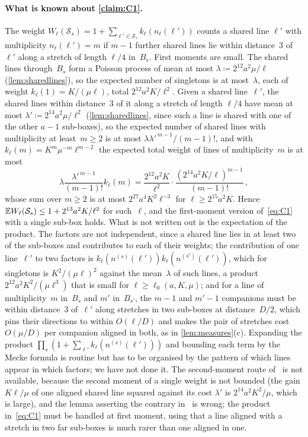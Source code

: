 \documentclass[11pt,letterpaper]{article}
\begin{document}
\paragraph{What is known about \cref{claim:C1}.} The weight $W_\ell(\mathcal S_s)=1+\sum_{\ell'\in\mathcal S_s}k_\ell(n_{\ell}(\ell'))$ counts a shared line $\ell'$ with multiplicity $n_\ell(\ell')=m$ if $m-1$ further shared lines lie within distance~$3$ of~$\ell'$ along a stretch of length $\ell/4$ in~$B_s$. First moments are small. The shared lines through~$B_s$ form a Poisson process of mean at most $\lambda\coloneqq2^{12}a^2\mu/\ell$ (\cref{lem:sharedlines}), so the expected number of singletons is at most~$\lambda$, each of weight $k_\ell(1)=K/(\mu\ell)$, total $2^{12}a^2K/\ell^2$. Given a shared line~$\ell'$, the shared lines within distance~$3$ of it along a stretch of length $\ell/4$ have mean at most $\lambda'\coloneqq2^{14}a^2\mu/\ell^2$ (\cref{lem:sharedlines}, since such a line is shared with one of the other $a-1$ sub-boxes), so the expected number of shared lines with multiplicity at least~$m\ge2$ is at most $\lambda\lambda'^{\,m-1}/(m-1)!$, and with $k_\ell(m)=K^m\mu^{-m}\ell^{m-2}$ the expected total weight of lines of multiplicity~$m$ is at most
\begin{equation*}
  \lambda\frac{\lambda'^{\,m-1}}{(m-1)!}k_\ell(m)=\frac{2^{12}a^2K}{\ell^2}\cdot\frac{(2^{14}a^2K/\ell)^{m-1}}{(m-1)!}\,,
\end{equation*}
whose sum over $m\ge2$ is at most $2^{27}a^4K^2\ell^{-3}$ for $\ell\ge2^{15}a^2K$. Hence $\mathbb E W_\ell(\mathcal S_s)\le1+2^{13}a^2K/\ell^2$ for such~$\ell$, and the first-moment version of~\eqref{eq:C1} with a single sub-box holds. What is not written out is the expectation of the product. The factors are not independent, since a shared line lies in at least two of the sub-boxes and contributes to each of their weights; the contribution of one line~$\ell'$ to two factors is $k_\ell(n^{(s)}(\ell'))k_\ell(n^{(s')}(\ell'))$, which for singletons is $K^2/(\mu\ell)^2$ against the mean~$\lambda$ of such lines, a product $2^{12}a^2K^2/(\mu\ell^3)$ that is small for $\ell\ge\ell_0(a,K,\mu)$; and for a line of multiplicity~$m$ in~$B_s$ and $m'$ in~$B_{s'}$, the $m-1$ and $m'-1$ companions must be within distance~$3$ of~$\ell'$ along stretches in two sub-boxes at distance~$D/2$, which pins their directions to within $O(\ell/D)$ and makes the pair of stretches cost $O(\mu/D)$ per companion aligned in both, as in \cref{lem:measures}(c). Expanding the product $\prod_s(1+\sum_{\ell'}k_\ell(n^{(s)}(\ell')))$ and bounding each term by the Mecke formula is routine but has to be organised by the pattern of which lines appear in which factors; we have not done it. The second-moment route of~\cite{MS26} is not available, because the second moment of a single weight is not bounded (the gain $K\ell/\mu$ of one aligned shared line squared against its cost $\lambda'$ is $2^{14}a^2K^2/\mu$, which is large), and the lemma asserting the contrary in~\cite{MS26} is wrong; the product in~\eqref{eq:C1} must be handled at first moment, using that a line aligned with a stretch in two far sub-boxes is much rarer than one aligned in one.
\end{document}
